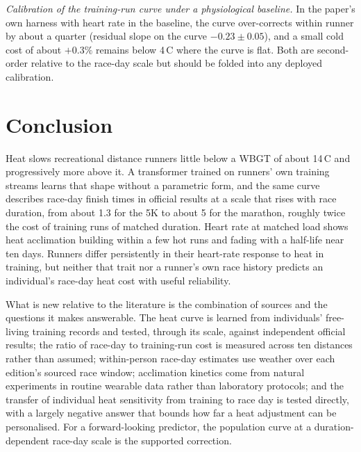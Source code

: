 \documentclass[11pt]{article}
\renewcommand{\_}{\textunderscore\allowbreak}
\begin{document}
\emph{Calibration of the training-run curve under a physiological baseline.} In the paper's own harness with heart rate in the baseline, the curve over-corrects within runner by about a quarter (residual slope on the curve $-0.23 \pm 0.05$), and a small cold cost of about $+0.3\%$ remains below 4\,\textdegree C where the curve is flat. Both are second-order relative to the race-day scale but should be folded into any deployed calibration.

\section{Conclusion}
\label{sec:conclusion}

Heat slows recreational distance runners little below a WBGT of about 14\,\textdegree C and progressively more above it. A transformer trained on runners' own training streams learns that shape without a parametric form, and the same curve describes race-day finish times in official results at a scale that rises with race duration, from about 1.3 for the 5K to about 5 for the marathon, roughly twice the cost of training runs of matched duration. Heart rate at matched load shows heat acclimation building within a few hot runs and fading with a half-life near ten days. Runners differ persistently in their heart-rate response to heat in training, but neither that trait nor a runner's own race history predicts an individual's race-day heat cost with useful reliability.

What is new relative to the literature is the combination of sources and the questions it makes answerable. The heat curve is learned from individuals' free-living training records and tested, through its scale, against independent official results; the ratio of race-day to training-run cost is measured across ten distances rather than assumed; within-person race-day estimates use weather over each edition's sourced race window; acclimation kinetics come from natural experiments in routine wearable data rather than laboratory protocols; and the transfer of individual heat sensitivity from training to race day is tested directly, with a largely negative answer that bounds how far a heat adjustment can be personalised. For a forward-looking predictor, the population curve at a duration-dependent race-day scale is the supported correction.

\clearpage

\clearpage
\appendix
\renewcommand{\thetable}{A\arabic{table}}
\setcounter{table}{0} %
\renewcommand{\thefigure}{A\arabic{figure}}
\setcounter{figure}{0}
 

\end{document}
